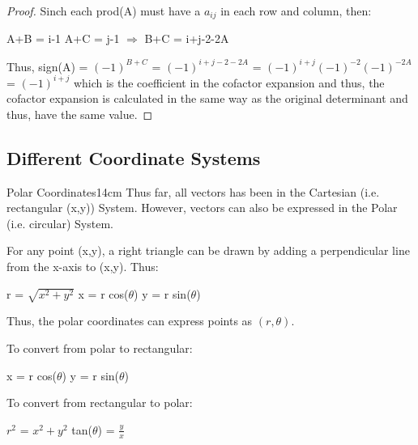 \begin{proof}
        Sinch each prod(A) must have a $a_{ij}$ in each row and column, then:

        \hspace{0.5cm}
        A+B = i-1
        \hspace{1cm}
        A+C = j-1
        \hspace{1cm}
        $\Rightarrow$
        \hspace{1cm}
        B+C = i+j-2-2A

        Thus, sign(A) = $(-1)^{B+C}$ = $(-1)^{i+j-2-2A}$
        = $(-1)^{i+j}(-1)^{-2}(-1)^{-2A}$
        = $(-1)^{i+j}$
        which is the coefficient in the cofactor expansion
        and thus, the cofactor expansion is calculated in the same way
        as the original determinant and thus, have the same value.
    \end{proof}

    \newpage





\subsection{ Different Coordinate Systems }

    \begin{definition}{Polar Coordinates}{14cm}
        Thus far, all vectors has been in the Cartesian
        (i.e. rectangular (x,y)) System.
        However, vectors can also be expressed in the Polar
        (i.e. circular) System.

        \vspace{0.3cm}

        For any point (x,y), a right triangle can be drawn by
        adding a perpendicular line from the x-axis to (x,y).
        Thus:

        \hspace{0.5cm}
        r = $\sqrt{x^2 + y^2}$
        \hspace{1cm}
        x = r cos($\theta$)
        \hspace{1cm}
        y = r sin($\theta$)

        Thus, the {\color{lblue} polar coordinates} can express points
        as $(r,\theta)$.

        \hspace{0.5cm}
        To convert from polar to rectangular:

        \hspace{1cm}
        x = r cos($\theta$)
        \hspace{1cm}
        y = r sin($\theta$)

        \hspace{0.5cm}
        To convert from rectangular to polar:

        \hspace{1cm}
        $r^2$ = $x^2 + y^2$
        \hspace{1cm}
        tan($\theta$) = $\frac{y}{x}$
    \end{definition}

